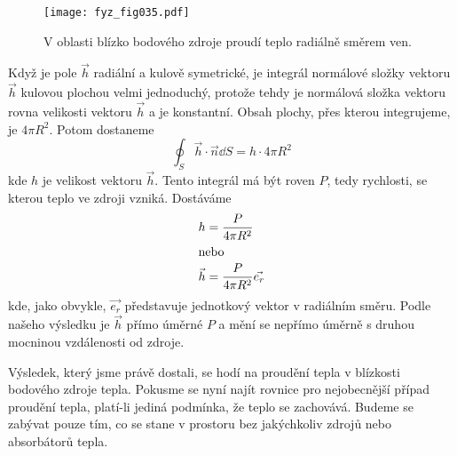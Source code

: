{      \begin{figure}[ht!]  %
        \centering
        \texttt{[image: fyz\_fig035.pdf]}
        \caption{V oblasti blízko bodového zdroje proudí teplo radiálně směrem ven.}
        \label{fyz:fig035}
      \end{figure}      
      Když je pole \(\vec{h}\) radiální a kulově symetrické, je integrál normálové složky vektoru 
      \(\vec{h}\) kulovou plochou velmi jednoduchý, protože tehdy je normálová složka vektoru rovna 
      velikosti vektoru \(\vec{h}\) a je konstantní. Obsah plochy, přes kterou integrujeme, je 
      \(4\pi R^2\). Potom dostaneme 
      \begin{equation}\label{fyz:eq_gauss6}
       \oint_S\vec{h}\cdot\vec{n}\dd{S} = h\cdot4\pi R^2
      \end{equation}
      kde \(h\) je velikost vektoru \(\vec{h}\). Tento integrál má být roven \(P\), tedy rychlosti, 
      se kterou teplo ve zdroji vzniká. Dostáváme
      \begin{align}
       h       &= \frac{P}{4\pi R^2}                \nonumber                  \\
       \shortintertext{nebo}
       \vec{h} &= \frac{P}{4\pi R^2}\vec{e_r}       \label{fyz:eq_gauss7}
      \end{align} 
      kde, jako obvykle, \(\vec{e_r}\) představuje jednotkový vektor v radiálním směru. Podle 
      našeho výsledku je \(\vec{h}\) přímo úměrné \(P\) a mění se nepřímo úměrně s druhou mocninou 
      vzdálenosti od zdroje.
      
      Výsledek, který jsme právě dostali, se hodí na proudění tepla v blízkosti bodového zdroje 
      tepla. Pokusme se nyní najít rovnice pro nejobecnější případ proudění tepla, platí-li jediná 
      podmínka, že teplo se zachovává. Budeme se zabývat pouze tím, co se stane v prostoru bez 
      jakýchkoliv zdrojů nebo absorbátorů tepla.
      
}
